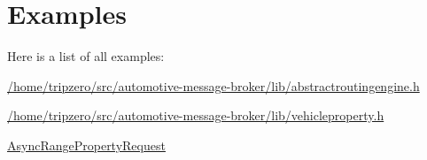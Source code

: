 \section{Examples}
Here is a list of all examples\-:\begin{DoxyCompactItemize}
\item 
\hyperlink{_2home_2tripzero_2src_2automotive-message-broker_2lib_2abstractroutingengine_8h-example}{/home/tripzero/src/automotive-\/message-\/broker/lib/abstractroutingengine.\-h}
\item 
\hyperlink{_2home_2tripzero_2src_2automotive-message-broker_2lib_2vehicleproperty_8h-example}{/home/tripzero/src/automotive-\/message-\/broker/lib/vehicleproperty.\-h}
\item 
\hyperlink{AsyncRangePropertyRequest-example}{Async\-Range\-Property\-Request}
\end{DoxyCompactItemize}
